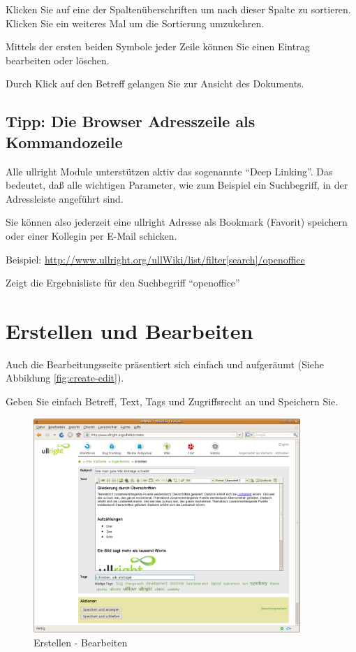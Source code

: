 \documentclass[article, a4paper, oneside, 11pt]{memoir}
\begin{document}
Klicken Sie auf eine der Spaltenüberschriften um nach dieser Spalte zu sortieren. Klicken Sie ein weiteres Mal um die Sortierung umzukehren.

Mittels der ersten beiden Symbole jeder Zeile können Sie einen Eintrag bearbeiten oder löschen.

Durch Klick auf den Betreff gelangen Sie zur Ansicht des Dokuments.

\subsection{Tipp: Die Browser Adresszeile als Kommandozeile}
Alle ullright Module unterstützen aktiv das sogenannte "`Deep Linking"'. Das bedeutet, daß alle wichtigen Parameter, wie zum Beispiel ein Suchbegriff, in der Adressleiste angeführt sind.

Sie können also jederzeit eine ullright Adresse als Bookmark (Favorit) speichern oder einer Kollegin per E-Mail schicken.

Beispiel: \url{http://www.ullright.org/ullWiki/list/filter[search]/openoffice}

Zeigt die Ergebnisliste für den Suchbegriff "`openoffice"'




\section{Erstellen und Bearbeiten}
Auch die Bearbeitungsseite präsentiert sich einfach und aufgeräumt (Siehe Abbildung \vref{fig:create-edit}).

Geben Sie einfach Betreff, Text, Tags und Zugriffsrecht an und Speichern Sie.

\begin{figure}[htp]
\centering
\includegraphics[width=0.9\textwidth]{create-edit}
\caption{Erstellen - Bearbeiten}
\label{fig:create-edit}
\end{figure}
\end{document}
